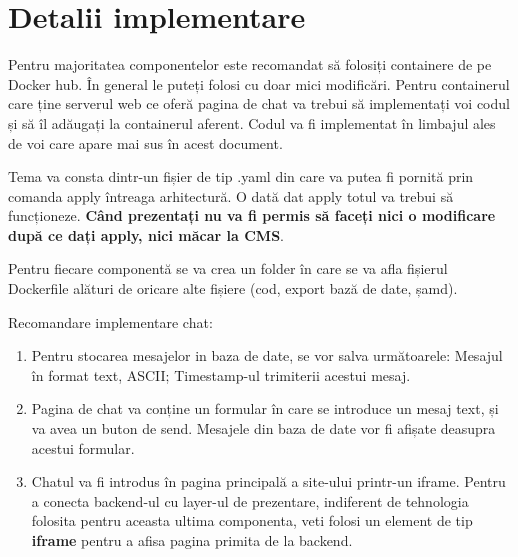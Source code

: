 \documentclass{article}
\newcounter{ProblemCounter} %
\newcommand{\ProblemName}{}
\newenvironment{Problem}[1][Sectiunea \arabic{ProblemCounter}]{ %
\stepcounter{ProblemCounter} %
\renewcommand{\ProblemName}{#1} %
\section{\ProblemName} %
}{}
\begin{document}
\begin{Problem}[Detalii implementare]

Pentru majoritatea componentelor este recomandat să folosiți containere de pe Docker hub. În general le puteți folosi cu doar mici modificări. Pentru containerul care ține serverul web ce oferă pagina de chat va trebui să implementați voi codul și să îl adăugați la containerul aferent. Codul va fi implementat în limbajul ales de voi care apare mai sus în acest document.

Tema va consta dintr-un fișier de tip .yaml din care va putea fi pornită prin comanda apply întreaga arhitectură. O dată dat apply totul va trebui să funcționeze. \textbf{Când prezentați nu va fi permis să faceți nici o modificare după ce dați apply, nici măcar la CMS}.

Pentru fiecare componentă se va crea un folder în care se va afla fișierul Dockerfile alături de oricare alte fișiere (cod, export bază de date, șamd).

Recomandare implementare chat:

\begin{enumerate}
    \item Pentru stocarea mesajelor in baza de date, se vor salva următoarele: Mesajul în format text, ASCII; Timestamp-ul trimiterii acestui mesaj.
    \item Pagina de chat va conține un formular în care se introduce un mesaj text, și va avea un buton de send. Mesajele din baza de date vor fi afișate deasupra acestui formular.
    \item Chatul va fi introdus în pagina principală a site-ului printr-un iframe. Pentru a conecta backend-ul cu layer-ul de prezentare, indiferent de tehnologia folosita pentru aceasta ultima componenta, veti folosi un element de tip \textbf{iframe} pentru a afisa pagina primita de la backend.
\end{enumerate}

\end{Problem}
\end{document}
